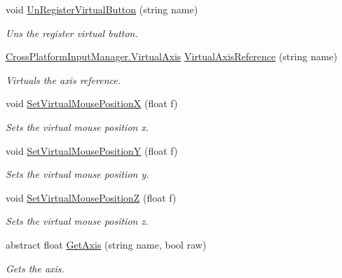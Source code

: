 \begin{DoxyCompactItemize}
void \hyperlink{class_lerp2_assets_1_1_cross_platform_input_1_1_cross_platform_input_1_1_virtual_input_accd8e7a64a08668b3c212427f7cd4f72}{Un\+Register\+Virtual\+Button} (string name)
\begin{DoxyCompactList}\small\item\em Uns the register virtual button. \end{DoxyCompactList}\item 
\hyperlink{class_lerp2_assets_1_1_cross_platform_input_1_1_cross_platform_input_manager_1_1_virtual_axis}{Cross\+Platform\+Input\+Manager.\+Virtual\+Axis} \hyperlink{class_lerp2_assets_1_1_cross_platform_input_1_1_cross_platform_input_1_1_virtual_input_a22b59803066a699b19cc22948f47518f}{Virtual\+Axis\+Reference} (string name)
\begin{DoxyCompactList}\small\item\em Virtuals the axis reference. \end{DoxyCompactList}\item 
void \hyperlink{class_lerp2_assets_1_1_cross_platform_input_1_1_cross_platform_input_1_1_virtual_input_a00733df65d9513671ea2e09702dcee4a}{Set\+Virtual\+Mouse\+PositionX} (float f)
\begin{DoxyCompactList}\small\item\em Sets the virtual mouse position x. \end{DoxyCompactList}\item 
void \hyperlink{class_lerp2_assets_1_1_cross_platform_input_1_1_cross_platform_input_1_1_virtual_input_a731248a4e25f3c071d596961f4e47c5d}{Set\+Virtual\+Mouse\+PositionY} (float f)
\begin{DoxyCompactList}\small\item\em Sets the virtual mouse position y. \end{DoxyCompactList}\item 
void \hyperlink{class_lerp2_assets_1_1_cross_platform_input_1_1_cross_platform_input_1_1_virtual_input_a321ecd4148cdd8d82b1f0fc0b9e437c6}{Set\+Virtual\+Mouse\+PositionZ} (float f)
\begin{DoxyCompactList}\small\item\em Sets the virtual mouse position z. \end{DoxyCompactList}\item 
abstract float \hyperlink{class_lerp2_assets_1_1_cross_platform_input_1_1_cross_platform_input_1_1_virtual_input_a76776877d69fea4fd538685816b03fab}{Get\+Axis} (string name, bool raw)
\begin{DoxyCompactList}\small\item\em Gets the axis. \end{DoxyCompactList}\item 

\end{DoxyCompactItemize}

